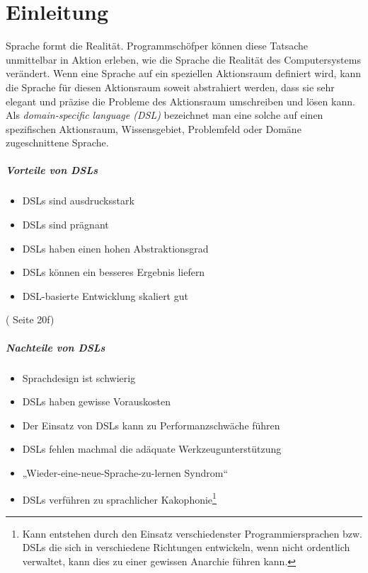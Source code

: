 \chapter{Einleitung}

Sprache formt die Realität. Programmschöfper können diese Tatsache unmittelbar
in Aktion erleben, wie die Sprache die Realität des Computersystems verändert.
Wenn eine Sprache auf ein speziellen Aktionsraum definiert wird, kann die
Sprache für diesen Aktionsraum soweit abstrahiert werden, dass sie sehr
elegant und präzise die Probleme des Aktionsraum umschreiben und lösen kann.
Als \emph{domain-specific language (DSL)} bezeichnet man eine solche auf
einen spezifischen Aktionsraum, Wissensgebiet, Problemfeld oder Domäne
zugeschnittene Sprache.

\paragraph{Vorteile von DSLs}

\begin{itemize}
  \item DSLs sind ausdrucksstark
  \item DSLs sind prägnant
  \item DSLs haben einen hohen Abstraktionsgrad
  \item DSLs können ein besseres Ergebnis liefern
  \item DSL-basierte Entwicklung skaliert gut
\end{itemize}

(\cite{dsls} Seite 20f)

\paragraph{Nachteile von DSLs}

\begin{itemize}
  \item Sprachdesign ist schwierig
  \item DSLs haben gewisse Vorauskosten
  \item Der Einsatz von DSLs kann zu Performanzschwäche führen
  \item DSLs fehlen machmal die adäquate Werkzeugunterstützung
  \item „Wieder-eine-neue-Sprache-zu-lernen Syndrom“
  \item DSLs verführen zu sprachlicher Kakophonie\footnote{
        Kann entstehen durch den Einsatz verschiedenster
        Programmiersprachen bzw. DSLs die sich in verschiedene
        Richtungen entwickeln, wenn nicht ordentlich verwaltet, kann
        dies zu einer gewissen Anarchie führen kann.}
\end{itemize}

